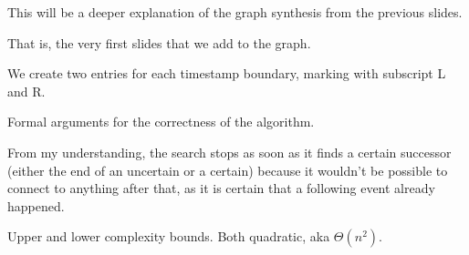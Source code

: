 This will be a deeper explanation of the graph synthesis from the previous slides.

\nextslides

\nextslides

\nextslides[slide=42,until=44,highlight=44]

\nextslides

That is, the very first slides that we add to the graph.

\nextslides[until=49, highlight=49]

We create two entries for each timestamp boundary, marking with subscript L and R.

\nextslides

\nextslides[until=70,highlight=51]

\nextslides[until=75] 

Formal arguments for the correctness of the algorithm.

From my understanding, the search stops as soon as it finds a certain successor (either the end of an uncertain or a certain) because it wouldn't be possible to connect to anything after that, as it is certain that a following event already happened.

\nextslides[until=80] 

Upper and lower complexity bounds. Both quadratic, aka $\Theta(n^{2})$.


\nextslides[until=82] 

\nextslides[slide=84] 
